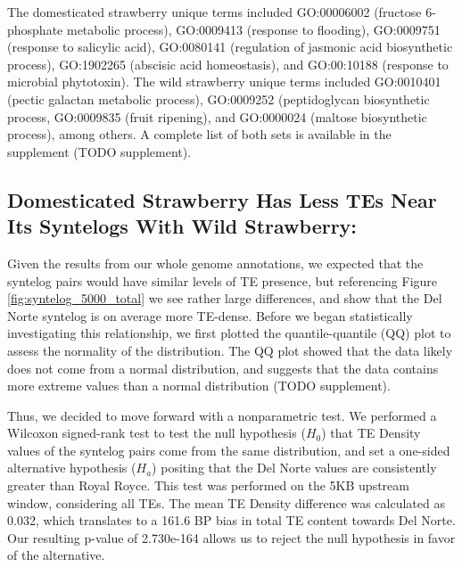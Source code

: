 \documentclass[fleqn,10pt]{olplainarticle}
\begin{document}
The domesticated strawberry unique terms included GO:00006002 (fructose 6-phosphate metabolic process), GO:0009413 (response to flooding), GO:0009751 (response to salicylic acid), GO:0080141 (regulation of jasmonic acid biosynthetic process), GO:1902265 (abscisic acid homeostasis), and GO:00:10188 (response to microbial phytotoxin).
The wild strawberry unique terms included GO:0010401 (pectic galactan metabolic process), GO:0009252 (peptidoglycan biosynthetic process, GO:0009835 (fruit ripening), and GO:0000024 (maltose biosynthetic process), 
among others.
A complete list of both sets is available in the supplement (TODO supplement).






\subsection{Domesticated Strawberry Has Less TEs Near Its Syntelogs With Wild Strawberry:}
Given the results from our whole genome annotations, we expected that the syntelog pairs would have similar levels of TE presence, but referencing Figure \ref{fig:syntelog_5000_total} we see rather large differences, and show that the Del Norte syntelog is on average more TE-dense.
Before we began statistically investigating this relationship, we first plotted the quantile-quantile (QQ) plot to assess the normality of the distribution.
The QQ plot showed that the data likely does not come from a normal distribution, and suggests that the data contains more extreme values than a normal distribution (TODO supplement).

Thus, we decided to move forward with a nonparametric test.
We performed a Wilcoxon signed-rank test to test the null hypothesis ($H_{0}$) that TE Density values of the syntelog pairs come from the same distribution, and set a one-sided alternative hypothesis ($H_{a}$) positing that the Del Norte values are consistently greater than Royal Royce.
This test was performed on the 5KB upstream window, considering all TEs.
The mean TE Density difference was calculated as 0.032, which translates to a 161.6 BP bias in total TE content towards Del Norte.
Our resulting p-value of 2.730e-164 allows us to reject the null hypothesis in favor of the alternative.
\end{document}
